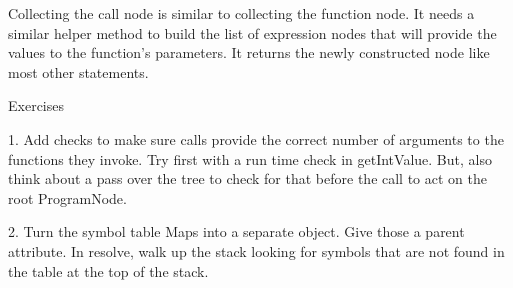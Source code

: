 Collecting the call node is similar to collecting the function node.
It needs a similar helper method to build the list of expression nodes
that will provide the values to the function's parameters. It
returns the newly constructed node like most other statements.

Exercises

1. Add checks to make sure calls provide the correct number of arguments
   to the functions they invoke. Try first with a run time check in
   getIntValue. But, also think about a pass over the tree to check
   for that before the call to act on the root ProgramNode.

2. Turn the symbol table Maps into a separate object. Give those a parent
   attribute. In resolve, walk up the stack looking for symbols that
   are not found in the table at the top of the stack.
